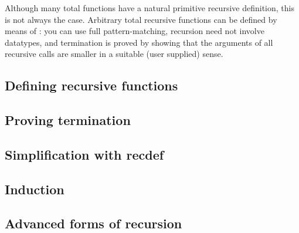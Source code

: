 Although many total functions have a natural primitive recursive definition,
this is not always the case. Arbitrary total recursive functions can be
defined by means of : you can use full pattern-matching,
recursion need not involve datatypes, and termination is proved by showing
that the arguments of all recursive calls are smaller in a suitable (user
supplied) sense.

\subsection{Defining recursive functions}



\subsection{Proving termination}



\subsection{Simplification with recdef}



\subsection{Induction}


\label{sec:recdef-induction}


\subsection{Advanced forms of recursion}
\label{sec:advanced-recdef}





